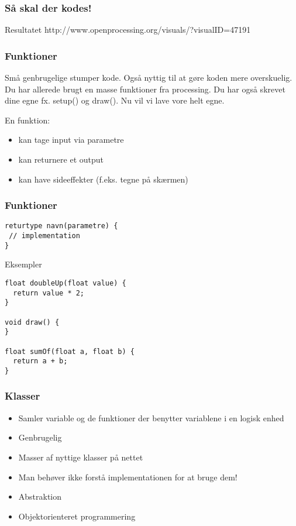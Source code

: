 \documentclass{beamer}
\begin{document}
\begin{frame}[fragile]
  \frametitle{Så skal der kodes!}
      
  \begin{block}{Resultatet}  
  http://www.openprocessing.org/visuals/?visualID=47191
  \end{block}

\end{frame}


\begin{frame}[fragile]
  \frametitle{Funktioner}
  
  Små genbrugelige stumper kode. Også nyttig til at gøre koden mere overskuelig.\\
  \vspace{0.5cm}
  Du har allerede brugt en masse funktioner fra processing. Du har også skrevet dine egne fx. setup() og draw(). Nu vil vi lave vore helt egne.
  
  \begin{block}{En funktion:} 
  \begin{itemize}
  \item kan tage input via parametre
  \item kan returnere et output
  \item kan have sideeffekter (f.eks. tegne på skærmen)
  \end{itemize}
  \end{block}

\end{frame}


\begin{frame}[fragile]
  \frametitle{Funktioner}
    
\begin{verbatim}
returtype navn(parametre) {
 // implementation
}
\end{verbatim}
  
  \begin{block}{Eksempler}
\begin{verbatim}
float doubleUp(float value) {
  return value * 2;
}

void draw() {
}

float sumOf(float a, float b) {
  return a + b;
}
\end{verbatim}    
  \end{block}

\end{frame}

\begin{frame}
  \frametitle{Klasser}

  \begin{itemize}
  \item Samler variable og de funktioner der benytter variablene i en logisk enhed
  \item Genbrugelig
  \item Masser af nyttige klasser på nettet
  \item Man behøver ikke forstå implementationen for at bruge dem! 
  \item Abstraktion
  \item Objektorienteret programmering
  \end{itemize}

\end{frame}
\end{document}
